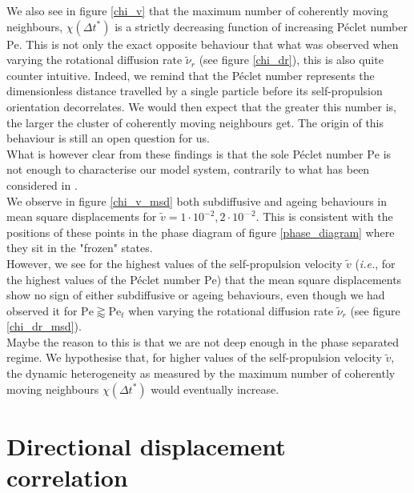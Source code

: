 \documentclass[class=report, float=false, crop=false]{standalone}
\begin{document}
We also see in figure \ref{chi_v} that the maximum number of coherently moving neighbours, $\chi(\Delta t^*)$ is a strictly decreasing function of increasing P\'eclet number $\text{Pe}$. This is not only the exact opposite behaviour that what was observed when varying the rotational diffusion rate $\tilde{\nu}_r$ (see figure \ref{chi_dr}), this is also quite counter intuitive. Indeed, we remind that the P\'eclet number represents the dimensionless distance travelled by a single particle before its self-propulsion orientation decorrelates. We would then expect that the greater this number is, the larger the cluster of coherently moving neighbours get. The origin of this behaviour is still an open question for us.\\

What is however clear from these findings is that the sole P\'eclet number $\text{Pe}$ is not enough to characterise our model system, contrarily to what has been considered in \cite{wysocki2014cooperative}.\\

We observe in figure \ref{chi_v_msd} both subdiffusive and ageing behaviours in mean square displacements for $\tilde{v} = 1\cdot10^{-2}, 2\cdot10^{—2}$. This is consistent with the positions of these points in the phase diagram of figure \ref{phase_diagram} where they sit in the "frozen" states.\\

However, we see for the highest values of the self-propulsion velocity $\tilde{v}$ (\textit{i.e.}, for the highest values of the P\'eclet number $\text{Pe}$) that the mean square displacements show no sign of either subdiffusive or ageing behaviours, even though we had observed it for $\text{Pe} \gtrapprox \text{Pe}_t$ when varying the rotational diffusion rate $\tilde{\nu}_r$ (see figure \ref{chi_dr_msd}).\\

Maybe the reason to this is that we are not deep enough in the phase separated regime. We hypothesise that, for higher values of the self-propulsion velocity $\tilde{v}$, the dynamic heterogeneity as measured by the maximum number of coherently moving neighbours $\chi(\Delta t^*)$ would eventually increase.

\section{Directional displacement correlation}
\label{section:directional_displacement_correlation}
\end{document}
